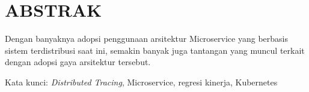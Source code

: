 \clearpage
\chapter*{ABSTRAK}

Dengan banyaknya adopsi penggunaan arsitektur Microservice yang berbasis sistem terdistribusi saat ini, semakin banyak juga tantangan yang muncul terkait dengan adopsi gaya arsitektur tersebut.


\vspace{15mm}
Kata kunci: \textit{Distributed Tracing}, Microservice, regresi kinerja, Kubernetes
\clearpage